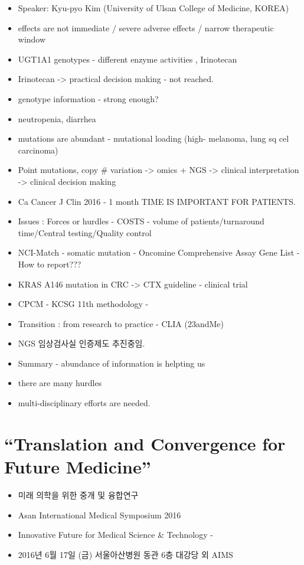 \documentclass[]{book}
\providecommand{\tightlist}{%
  \setlength{\itemsep}{0pt}\setlength{\parskip}{0pt}}
\begin{document}
\begin{itemize}
\tightlist
\item
  Speaker: Kyu-pyo Kim (University of Ulsan College of Medicine, KOREA)
\item
  effects are not immediate / severe adverse effects / narrow
  therapeutic window
\item
  UGT1A1 genotypes - different enzyme activities , Irinotecan
\item
  Irinotecan -\textgreater{} practical decision making - not reached.
\item
  genotype information - strong enough?
\item
  neutropenia, diarrhea
\item
  mutations are abundant - mutational loading (high- melanoma, lung sq
  cel carcinoma)
\item
  Point mutations, copy \# variation -\textgreater{} omics + NGS
  -\textgreater{} clinical interpretation -\textgreater{} clinical
  decision making
\item
  Ca Cancer J Clin 2016 - 1 month TIME IS IMPORTANT FOR PATIENTS.
\item
  Issues : Forces or hurdles - COSTS - volume of patients/turnaround
  time/Central testing/Quality control
\item
  NCI-Match - somatic mutation - Oncomine Comprehensive Assay Gene List
  - How to report???
\item
  KRAS A146 mutation in CRC -\textgreater{} CTX guideline - clinical
  trial
\item
  CPCM - KCSG 11th methodology -
\item
  Transition : from research to practice - CLIA (23andMe)
\item
  NGS 임상검사실 인증제도 추진중임.
\item
  Summary - abundance of information is helpting us
\item
  there are many hurdles
\item
  multi-disciplinary efforts are needed.
\end{itemize}

\chapter{\texorpdfstring{``Translation and Convergence for Future
Medicine''}{Translation and Convergence for Future Medicine}}\label{translation-and-convergence-for-future-medicine}

\begin{itemize}
\tightlist
\item
  미래 의학을 위한 중개 및 융합연구
\item
  Asan International Medical Symposium 2016
\item
  Innovative Future for Medical Science \& Technology -
\item
  2016년 6월 17일 (금) 서울아산병원 동관 6층 대강당 외 AIMS
\end{itemize}
\end{document}
